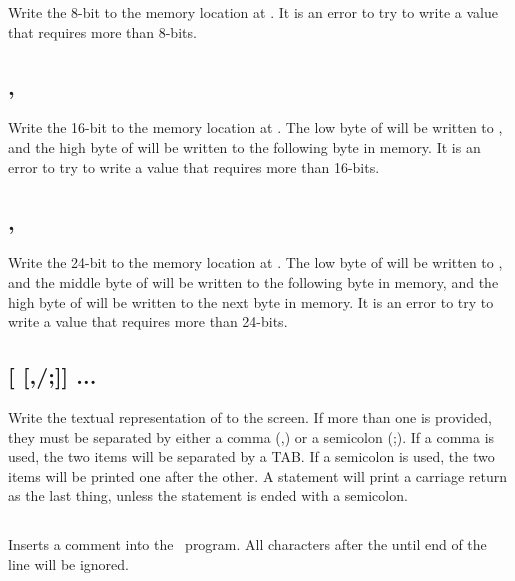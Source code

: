 \documentclass{report}
\begin{document}
    Write the 8-bit  to the memory location at .
    It is an error to try to write a value that requires more than 8-bits.

    \subsection*{ , }

    Write the 16-bit  to the memory location at .
    The low byte of  will be written to , and
    the high byte of  will be written to the following byte in memory.
    It is an error to try to write a value that requires more than 16-bits.    

    \subsection*{ , }

    Write the 24-bit  to the memory location at .
    The low byte of  will be written to , and
    the middle byte of  will be written to the following byte in memory,
    and the high byte of  will be written to the next byte in memory.
    It is an error to try to write a value that requires more than 24-bits.  

    \subsection*{ [ [,/;]] ...}

    Write the textual representation of  to the screen.
    If more than one  is provided, they must be separated by either a comma (,)
    or a semicolon (;).
    If a comma is used, the two items will be separated by a TAB.
    If a semicolon is used, the two items will be printed one after the other.
    A  statement will print a carriage return as the last thing, unless the
    statement is ended with a semicolon.

    \subsection*{ }

    Inserts a comment into the \BASIC\ program. All characters after the  until
    end of the line will be ignored.
\end{document}
